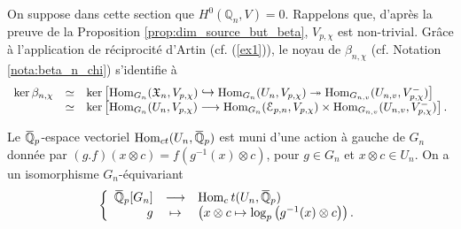 \documentclass[12pt]{amsart}
\newcommand\bQ{\mathbb{Q}}
\newcommand\cE{\mathcal{E}}
\newcommand\gX{\mathfrak{X}}
\newcommand{\ob}[1]{\mkern 1.5mu\overline{\mkern-1.5mu#1\mkern-1.5mu}\mkern 1.5mu}
\DeclareMathOperator{\Hom}{Hom}
\theoremstyle{defstyle}
\theoremstyle{thmstyle}
\begin{document}
On suppose dans cette section que $H^0(\bQ_n,V)=0$. Rappelons que, d'après la preuve de la Proposition \ref{prop:dim_source_but_beta}, $V_{p,\chi}$ est non-trivial. Grâce à l'application de réciprocité d'Artin (cf. (\ref{ex1})), le noyau de $\beta_{n,\chi}$ (cf. Notation \ref{nota:beta_n_chi}) s'identifie à 
\begin{equation}\label{eq:ker_beta_n_chi}
\begin{array}{rcl}
\ker \beta_{n,\chi}&\simeq&\ker\left[\Hom_{G_n}(\gX_n,V_{p,\chi}) \mathrel{\scalebox{1}[1.2]{$\hookrightarrow$}} \Hom_{G_n}(U_n,V_{p,\chi}) \twoheadrightarrow \Hom_{G_{n,v}}(U_{n,v},V_{p,\chi}^-)  \right] \\
&\simeq& \ker\left[ \Hom_{G_n}(U_n,V_{p,\chi}) \longrightarrow \Hom_{G_n}(\cE_{p,n},V_{p,\chi}) \times \Hom_{G_{n,v}}(U_{n,v},V_{p,\chi}^-) \right].
\end{array}
\end{equation}

Le $\ob{\bQ}_p$-espace vectoriel $\Hom_{\textrm{ct}}(U_n,\ob{\bQ}_p)$ est muni d'une action à gauche de $G_n$ donnée par $(g.f)(x\otimes c) = f(g^{-1}(x)\otimes c)$, pour $g\in G_n$ et $x\otimes c \in U_n$. On a un isomorphisme $G_n$-équivariant
\begin{equation}\label{isomQbar}
\left\{ \begin{array}{rcl}
\ob{\bQ}_p[G_n] & \longrightarrow & \Hom_\textrm{ct}(U_n,\ob{\bQ}_p) \\
g          & \mapsto         & \left( x\otimes c \mapsto \log_p\left(g^{-1}(x)\otimes c \right) \right).
\end{array} \right.
\end{equation}
\end{document}
